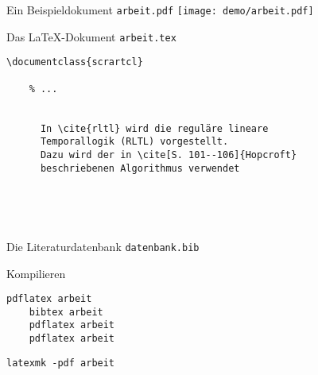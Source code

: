 \begin{Frame}[t]{Ein Beispieldokument \texttt{arbeit.pdf}}
  \texttt{[image: demo/arbeit.pdf]}
\end{Frame}

\begin{Frame}[fragile]{Das \LaTeX-Dokument \texttt{arbeit.tex}}
  \begin{lstlisting}[gobble=4]
    \documentclass{scrartcl}
    
    % ...
    
    
      In \cite{rltl} wird die reguläre lineare
      Temporallogik (RLTL) vorgestellt.
      Dazu wird der in \cite[S. 101--106]{Hopcroft}
      beschriebenen Algorithmus verwendet

      
      
    
  \end{lstlisting}
\end{Frame}

\begin{Frame}{Die Literaturdatenbank \texttt{datenbank.bib}}
  
\end{Frame}

\begin{Frame}[fragile]{Kompilieren}
  \begin{lstlisting}[language={},morekeywords={pdflatex,bibtex},gobble=4]
    pdflatex arbeit
    bibtex arbeit
    pdflatex arbeit
    pdflatex arbeit
  \end{lstlisting}

  \xxx
  \pause


  \begin{lstlisting}[language={},morekeywords={latexmk},gobble=4]
    latexmk -pdf arbeit
  \end{lstlisting}
\end{Frame}


